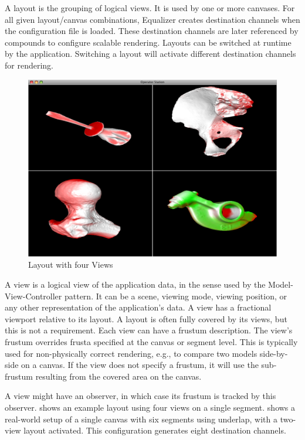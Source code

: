 A \textsf{layout} is the grouping of logical views. It is used by one or more
canvases. For all given layout/canvas combinations, Equalizer creates
destination channels when the configuration file is loaded. These destination
channels are later referenced by compounds to configure scalable rendering.
Layouts can be switched at runtime by the application. Switching a layout will
activate different destination channels for rendering.

\begin{figure}
 \includegraphics[width=.618\textwidth]{images/layout.png}
 {\caption{\label{fLayout}Layout with four Views}}
\end{figure}

A \textsf{view} is a logical view of the application data, in the sense used by
the Model-View-Controller pattern. It can be a scene, viewing mode, viewing
position, or any other representation of the application's data. A view has a
fractional viewport relative to its layout. A layout is often fully covered by
its views, but this is not a requirement. Each view can have a frustum
description. The view's frustum overrides frusta specified at the canvas or
segment level. This is typically used for non-physically correct rendering,
e.g., to compare two models side-by-side on a canvas. If the view does not
specify a frustum, it will use the sub-frustum resulting from the covered area
on the canvas.

A view might have an observer, in which case its frustum is tracked by this
observer.  shows an example layout using four views on a single
segment.  shows a real-world setup of a single canvas with six
segments using underlap, with a two-view layout activated. This configuration
generates eight destination channels.

